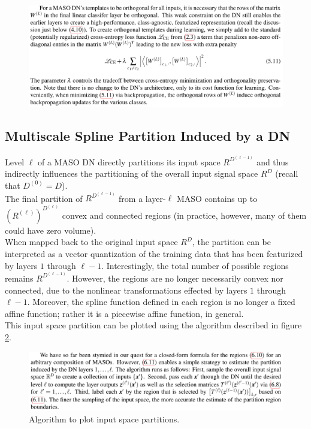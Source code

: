 \documentclass{article}
\begin{document}
\begin{figure}[h]
	\begin{center}
		\includegraphics[width=.8\linewidth]{Figure/def_orthotemplatepenalty}
		\label{fig:def_orthotemplatepenalty}
	\end{center}
\end{figure}

\subsection{Multiscale Spline Partition Induced by a DN}

Level $\ell$ of a MASO DN directly partitions its input space $R^{D^{(\ell-1)}}$ and thus indirectly influences the partitioning of the overall input signal space $R^D$ (recall that $ D^{(0)} = D$).\\
The final partition of $R^{D^{(\ell-1)}}$ from a layer-$\ell$ MASO contains up to $ (R^{(\ell)}) ^ {D^{(\ell)}}$ convex and connected regions (in practice, however, many of them could have zero volume).\\
When mapped back to the original input space $R^D$, the partition can be interpreted as a vector quantization of the training data that has been featurized by layers $1$ through $\ell - 1$. Interestingly, the total number of possible regions remains $R^{D^{(\ell-1)}}$. However, the regions are no longer necessarily convex nor connected, due to the nonlinear transformations effected by layers $1$ through $\ell-1$. Moreover, the spline function defined in each region is no longer a fixed affine function; rather it is a piecewise affine function, in general.\\
This input space partition can be plotted using the algorithm described in figure \ref{fig:algo_inputspacepartition}.




\begin{figure}[h]
	\begin{center}
		\includegraphics[width=.8\linewidth]{Figure/algo_inputspacepartition}
			\caption{Algorithm to plot input space partitions.}
		\label{fig:algo_inputspacepartition}
	\end{center}
\end{figure}
\end{document}

